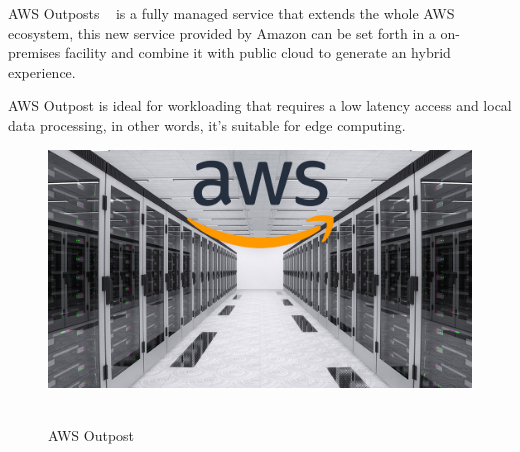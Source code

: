 AWS Outposts ~\cite{aws_outpost} is a fully managed service that extends the whole AWS ecosystem, this new service provided by Amazon can be set forth in a on-premises facility and combine it with public cloud to generate an hybrid experience.

AWS Outpost is ideal for workloading that requires a low latency access and local data processing, in other words, it's suitable for edge computing.

\begin{figure}[h]%
    \includegraphics[width=6.5in]{figures/aws_outpost.jpg}
~\caption{AWS Outpost}
\label{figure2.3}
\end{figure}